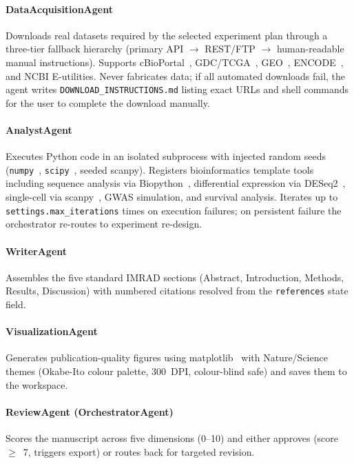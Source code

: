 \documentclass[11pt]{article}
\begin{document}
\paragraph{DataAcquisitionAgent}
Downloads real datasets required by the selected experiment plan
through a three-tier fallback hierarchy (primary API $\rightarrow$
REST/FTP $\rightarrow$ human-readable manual instructions).
Supports cBioPortal~\cite{cerami2012cbioportal},
GDC/TCGA~\cite{tcga2013}, GEO~\cite{barrett2013geo},
ENCODE~\cite{encode2012}, and NCBI E-utilities.
Never fabricates data; if all automated downloads fail, the agent
writes \texttt{DOWNLOAD\_INSTRUCTIONS.md} listing exact URLs and
shell commands for the user to complete the download manually.

\paragraph{AnalystAgent}
Executes Python code in an isolated subprocess with injected random
seeds (\texttt{numpy}~\cite{Harris2020numpy},
\texttt{scipy}~\cite{Virtanen2020scipy}, seeded scanpy).
Registers bioinformatics template tools including sequence analysis
via Biopython~\cite{Cock2009biopython}, differential expression via
DESeq2~\cite{Love2014deseq2}, single-cell via
scanpy~\cite{Wolf2018scanpy}, GWAS simulation, and survival analysis.
Iterates up to \texttt{settings.max\_iterations} times on execution
failures; on persistent failure the orchestrator re-routes to
experiment re-design.

\paragraph{WriterAgent}
Assembles the five standard IMRAD sections (Abstract, Introduction,
Methods, Results, Discussion) with numbered citations resolved from
the \texttt{references} state field.

\paragraph{VisualizationAgent}
Generates publication-quality figures using
matplotlib~\cite{Hunter2007matplotlib} with Nature/Science themes
(Okabe-Ito colour palette, 300~DPI, colour-blind safe) and saves them
to the workspace.

\paragraph{ReviewAgent (OrchestratorAgent)}
Scores the manuscript across five dimensions (0--10) and either
approves (score~$\geq$~7, triggers export) or routes back for
targeted revision.
\end{document}
